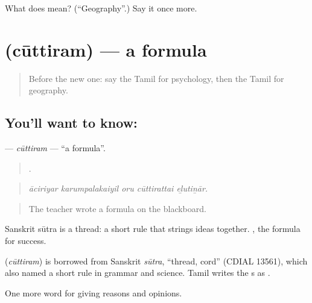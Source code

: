 \begin{tcolorbox}[breakable,colback=teal!4,colframe=teal!35!black,title={Before you move on}]
What does  mean? (\textquotedblleft{}Geography\textquotedblright{}.) Say it once more.
\end{tcolorbox}
\section[\texorpdfstring{\ta{சூத்திரம்} (cūttiram)}{சூத்திரம் (cūttiram)}]{ (cūttiram) — a formula}

\label{lesson:TA-C366-cuttiram}



\begin{quote}
Before the new one: say the Tamil for psychology, then the Tamil for geography.
\end{quote}

\subsection*{You'll want to know: }
\textbf{} — \emph{cūttiram} — \textquotedblleft{}a formula\textquotedblright{}.

\begin{quote}
    .
\end{quote}

\begin{quote}
\emph{āciriyar karumpalakaiyil oru cūttirattai eḻutiṉār.}
\end{quote}

\begin{quote}
The teacher wrote a formula on the blackboard.
\end{quote}

Sanskrit sūtra is a thread: a short rule that strings ideas together.  , the formula for success.

\begin{cousinweb}
\textbf{} (\emph{cūttiram}) is borrowed from Sanskrit \emph{sūtra}, \textquotedblleft{}thread, cord\textquotedblright{} (CDIAL 13561), which also named a short rule in grammar and science. Tamil writes the s as .
\end{cousinweb}

\begin{grammarlens}[title={What you've built}]
One more word for giving reasons and opinions.
\end{grammarlens}

